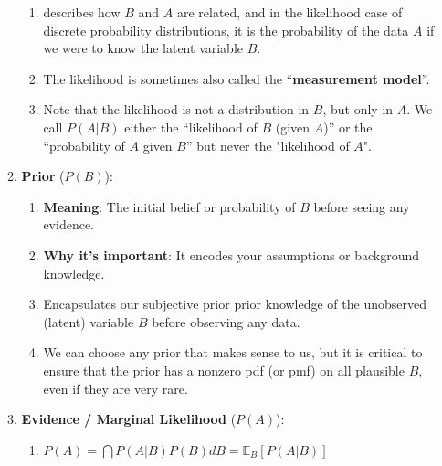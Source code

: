 \begin{enumerate}
\begin{enumerate}
\begin{enumerate}
            \item describes how $B$ and $A$ are related, and in the likelihood case of discrete probability distributions, it is the probability of the data $A$ if we were to know the latent variable $B$.
            \hfill\cite{mfml/book/mml/Deisenroth-Faisal-Ong}

            \item The likelihood is sometimes also called the “\textbf{measurement model}”.
            \hfill\cite{mfml/book/mml/Deisenroth-Faisal-Ong}

            \item Note that the likelihood is not a distribution in $B$, but only in $A$.
            We call $P(A | B)$ either the “likelihood of $B$ (given $A$)” or the “probability of $A$ given $B$” but never the "likelihood of $A$".
            \hfill\cite{mfml/book/mml/Deisenroth-Faisal-Ong}
        \end{enumerate}

        \item \textbf{Prior} ($P(B)$):
        \begin{enumerate}
            \item \textbf{Meaning}: The initial belief or probability of $B$ before seeing any evidence.
            \hfill \cite{common/online/chatgpt}

            \item \textbf{Why it's important}: It encodes your assumptions or background knowledge.
            \hfill \cite{common/online/chatgpt}

            \item Encapsulates our subjective prior prior knowledge of the unobserved (latent) variable $B$ before observing any data.
            \hfill\cite{mfml/book/mml/Deisenroth-Faisal-Ong}

            \item We can choose any prior that makes sense to us, but it is critical to ensure that the prior has a nonzero pdf (or pmf) on all plausible $B$, even if they are very rare.
            \hfill\cite{mfml/book/mml/Deisenroth-Faisal-Ong}
        \end{enumerate}

        \item \textbf{Evidence / Marginal Likelihood} ($P(A)$):
        \begin{enumerate}
            \item
            $
                P(A)
                = \dint P(A|B) P(B) dB
                = \mathbb{E}_B[P(A|B)]
            $
            \hfill \cite{mfml/book/mml/Deisenroth-Faisal-Ong}


\end{enumerate}
\end{enumerate}
\end{enumerate}
